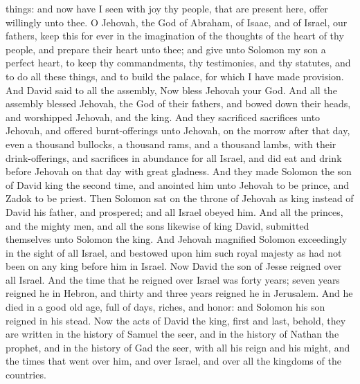 things: and now have I seen with joy thy people, that are present here, offer willingly unto thee. O Jehovah, the God of Abraham, of Isaac, and of Israel, our fathers, keep this for ever in the imagination of the thoughts of the heart of thy people, and prepare their heart unto thee; and give unto Solomon my son a perfect heart, to keep thy commandments, thy testimonies, and thy statutes, and to do all these things, and to build the palace, for which I have made provision.  And David said to all the assembly, Now bless Jehovah your God. And all the assembly blessed Jehovah, the God of their fathers, and bowed down their heads, and worshipped Jehovah, and the king. And they sacrificed sacrifices unto Jehovah, and offered burnt-offerings unto Jehovah, on the morrow after that day, even a thousand bullocks, a thousand rams, and a thousand lambs, with their drink-offerings, and sacrifices in abundance for all Israel, and did eat and drink before Jehovah on that day with great gladness. And they made Solomon the son of David king the second time, and anointed him unto Jehovah to be prince, and Zadok to be priest. Then Solomon sat on the throne of Jehovah as king instead of David his father, and prospered; and all Israel obeyed him. And all the princes, and the mighty men, and all the sons likewise of king David, submitted themselves unto Solomon the king. And Jehovah magnified Solomon exceedingly in the sight of all Israel, and bestowed upon him such royal majesty as had not been on any king before him in Israel.  Now David the son of Jesse reigned over all Israel. And the time that he reigned over Israel was forty years; seven years reigned he in Hebron, and thirty and three years reigned he in Jerusalem. And he died in a good old age, full of days, riches, and honor: and Solomon his son reigned in his stead. Now the acts of David the king, first and last, behold, they are written in the history of Samuel the seer, and in the history of Nathan the prophet, and in the history of Gad the seer, with all his reign and his might, and the times that went over him, and over Israel, and over all the kingdoms of the countries. 